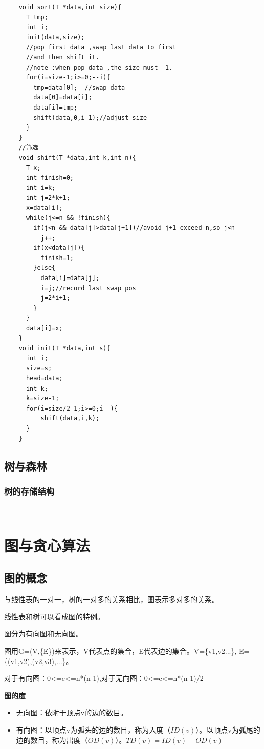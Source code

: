 \documentclass{article}
\begin{document}
		\begin{verbatim}
    void sort(T *data,int size){
      T tmp;
      int i;
      init(data,size);
      //pop first data ,swap last data to first 
      //and then shift it.
      //note :when pop data ,the size must -1.
      for(i=size-1;i>=0;--i){
        tmp=data[0];  //swap data 
        data[0]=data[i];
        data[i]=tmp;
        shift(data,0,i-1);//adjust size
      }
    }
    //筛选
    void shift(T *data,int k,int n){
      T x;
      int finish=0;
      int i=k;
      int j=2*k+1;
      x=data[i];
      while(j<=n && !finish){
        if(j<n && data[j]>data[j+1])//avoid j+1 exceed n,so j<n
          j++;
        if(x<data[j]){
          finish=1;
        }else{
          data[i]=data[j];
          i=j;//record last swap pos
          j=2*i+1;
        }
      }
      data[i]=x;
    }
    void init(T *data,int s){
      int i;
      size=s;
      head=data;
      int k;
      k=size-1;
      for(i=size/2-1;i>=0;i--){
          shift(data,i,k);
      }
    }
		\end{verbatim}

	\subsection{树与森林}
	\subsubsection{树的存储结构}



	\	
\section{图与贪心算法}
	\subsection{图的概念}
		与线性表的一对一，树的一对多的关系相比，图表示多对多的关系。

		线性表和树可以看成图的特例。

		图分为有向图和无向图。

		图用G=(V,\{E\})来表示，V代表点的集合，E代表边的集合。V=\{v1,v2...\},
		E=\{(v1,v2),(v2,v3),...\}。

		对于有向图：0<=e<=n*(n-1),对于无向图：0<=e<=n*(n-1)/2

		\textbf{图的度}
		\begin{itemize}
			\item 无向图：依附于顶点v的边的数目。
			\item 有向图：以顶点v为弧头的边的数目，称为入度（$ID(v)$）。以顶点v为弧尾的边的数目，称为出度（$OD(v)$）。$TD(v)=ID(v)+OD(v)$
		\end{itemize}
\end{document}
